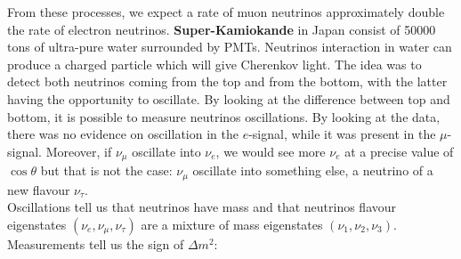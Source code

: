 \documentclass[10.75pt,a4paper,openright,bottom=2cm]{article}
\begin{document}
\begin{minipage}{0.5\textwidth}
\begin{center}
\end{center}
\end{minipage}
From these processes, we expect a rate of muon neutrinos approximately double the rate of electron neutrinos. \textbf{Super-Kamiokande} in Japan consist of 50000 tons of ultra-pure water surrounded by PMTs. Neutrinos interaction in water can produce a charged particle which will give Cherenkov light. The idea was to detect both neutrinos coming from the top and from the bottom, with the latter having the opportunity to oscillate. By looking at the difference between top and bottom, it is possible to measure neutrinos oscillations. By looking at the data, there was no evidence on oscillation in the $e$-signal, while it was present in the $\mu$-signal. Moreover, if $\nu_\mu$ oscillate into $\nu_e$, we would see more $\nu_e$ at a precise value of $\cos\theta$ but that is not the case: $\nu_\mu$ oscillate into something else, a neutrino of a new flavour $\nu_\tau$.\\
Oscillations tell us that neutrinos have mass and that neutrinos flavour eigenstates $(\nu_e,\nu_\mu,\nu_\tau)$ are a mixture of mass eigenstates $(\nu_1,\nu_2,\nu_3)$. Measurements tell us the sign of $\Delta m^2$:
\end{document}
